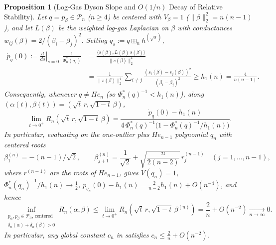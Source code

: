 \documentclass[11pt,a4paper]{article}
\newtheorem{proposition}[theorem]{Proposition}
\theoremstyle{definition}
\newcommand{\boxplusn}{\boxplus_n}
\begin{document}
\begin{proposition}[Log-Gas Dyson Slope and $O(1/n)$ Decay of Relative Stability]
\label{prop:dyson-relative-obstruction}
Let $q = p_\beta \in \mathcal{P}_n$ ($n \ge 4$) be centered with $V_\beta = 1$ ($\|\beta\|_2^2 = n(n-1)$), and let $L(\beta)$ be the weighted log-gas Laplacian on $\beta$ with conductances $w_{ij}(\beta) = 2/(\beta_i - \beta_j)^2$. Setting $q_s := q \boxplusn h^{(\sqrt{s})}$,
\begin{equation}
\label{eq:dyson-slope}
\begin{aligned}
\dot{p}_q(0) := \left.\frac{d}{ds}\right|_{s=0^+} \frac{1}{\Phi_n^*(q_s)} &= \frac{\langle s(\beta), L(\beta)\, s(\beta)\rangle}{\|s(\beta)\|_2^4} \\
&= \frac{1}{\|s(\beta)\|_2^4} \sum_{i \neq j} \frac{(s_i(\beta) - s_j(\beta))^2}{(\beta_i - \beta_j)^2} \ge h_1(n) = \frac{4}{n(n-1)}.
\end{aligned}
\end{equation}
Consequently, whenever $q \neq He_n$ (so $\Phi_n^*(q)^{-1} < h_1(n)$), along $(\alpha(t), \beta(t)) = (\sqrt{t}\, r, \sqrt{1-t}\, \beta)$,
\[
\lim_{t \to 0^+} R_n(\sqrt{t}\, r, \sqrt{1-t}\, \beta) = \frac{\dot{p}_q(0) - h_1(n)}{4\,\Phi_n^*(q)^{-1}\big(1 - \Phi_n^*(q)^{-1}/h_1(n)\big)}.
\]
In particular, evaluating on the one-outlier plus $He_{n-1}$ polynomial $q_n$ with centered roots
\[
\beta^{(n)}_1 = -(n-1)/\sqrt{2}, \qquad \beta^{(n)}_{j+1} = \frac{1}{\sqrt{2}} + \sqrt{\frac{n}{2(n-2)}}\, r^{(n-1)}_j \quad (j=1,\dots,n-1),
\]
where $r^{(n-1)}$ are the roots of $He_{n-1}$, gives $V(q_n) = 1$, $\Phi_n^*(q_n)^{-1}/h_1(n) \to \frac{1}{2}$, $\dot{p}_{q_n}(0) - h_1(n) = \frac{2}{n-2} h_1(n) + O(n^{-4})$, and hence
\[
\inf_{\substack{p_\alpha, p_\beta \in \mathcal{P}_n,\, \text{centered} \\ \delta_n(\alpha) + \delta_n(\beta) > 0}} R_n(\alpha, \beta) \le \lim_{t \to 0^+} R_n(\sqrt{t}\, r, \sqrt{1-t}\, \beta^{(n)}) = \frac{2}{n} + O(n^{-2}) \xrightarrow[n\to\infty]{} 0.
\]
In particular, any global constant $c_n$ in \cite[Conjecture~8.1 / eqs.~(100)--(101)]{HH2026} satisfies $c_n \le \frac{2}{n} + O(n^{-2})$.
\end{proposition}
\end{document}
